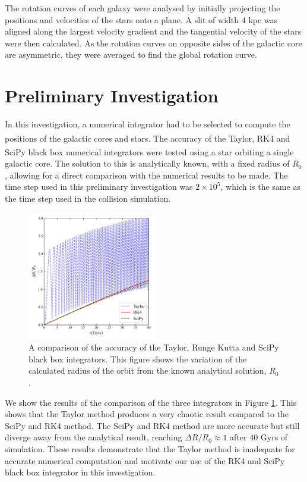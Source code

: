 \documentclass[10pt, twocolumn]{revtex4}    %
\begin{document}
The rotation curves of each galaxy were analysed by initially projecting the positions and velocities of the stars onto a plane. A slit of width $4$ kpc was aligned along the largest velocity gradient and the tangential velocity of the stars were then calculated. As the rotation curves on opposite sides of the galactic core are asymmetric, they were averaged to find the global rotation curve. 

\section{Preliminary Investigation}

In this investigation, a numerical integrator had to be selected to compute the positions of the galactic cores and stars. The accuracy of the Taylor\textsuperscript{\cite{ButcherNumericalmethodsordinary2008}}, RK4\textsuperscript{\cite{ButcherNumericalmethodsordinary2008}} and SciPy black box\textsuperscript{\cite{scipyintegrateode}} numerical integrators were tested using a star orbiting a single galactic core. The solution to this is analytically known, with a fixed radius of $R_0$, allowing for a direct comparison with the numerical results to be made. The time step used in this preliminary investigation was $2 \times 10^5$, which is the same as the time step used in the collision simulation.

\begin{figure}[t!]
\centering
\includegraphics[width=0.5\textwidth]{20180316_122555_INTEGRATOR_ANALYSIS}
\caption{A comparison of the accuracy of the Taylor, Runge Kutta and SciPy black box integrators. This figure shows the variation of the calculated radius of the orbit from the known analytical solution, $R_0$.}
\label{fig: integrator comp}
\end{figure}

We show the results of the comparison of the three integrators in Figure \ref{fig: integrator comp}. This shows that the Taylor method produces a very chaotic result compared to the SciPy and RK4 method. The SciPy and RK4 method are more accurate but still diverge away from the analytical result, reaching $\Delta R/R_{0} \approx 1$ after 40 Gyrs of simulation. These results demonstrate that the Taylor method is inadequate for accurate numerical computation and motivate our use of the RK4 and SciPy black box integrator in this investigation.
\end{document}
